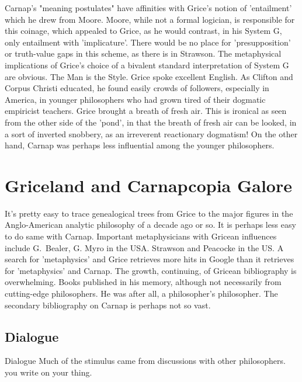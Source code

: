 \documentclass[10pt,titlepage]{book}
\begin{document}
{Carnap's "meaning postulates" have affinities with Grice's notion  of 'entailment' which he drew from Moore.
Moore, while not a formal logician, is responsible for this coinage, which appealed to Grice, as he would contrast, in his System G, only entailment with 'implicature'. 
There would be no place for 'presupposition' or truth-value gaps in this scheme, as there is in Strawson.
The metaphysical implications of Grice's choice of a bivalent standard interpretation of System G are obvious. 
The  Man is the Style.
Grice spoke excellent English.
As Clifton and Corpus Christi educated, he found easily crowds of followers, especially in America, in younger philosophers who had grown tired of their dogmatic empiricist teachers.
Grice brought a breath of fresh air.
This is ironical as seen from the other side of  the 'pond', in that the breath of fresh air can be looked, in a sort of inverted snobbery, as an irreverent reactionary dogmatism!
On the other hand, Carnap was perhaps less influential among the younger philosophers.   

\section{Griceland and Carnapcopia Galore}

It's pretty easy to trace genealogical trees from Grice to the major figures in the Anglo-American analytic philosophy of a decade ago or so.
It is perhaps less easy to do same with Carnap.
Important metaphysicians with Gricean influences include G.~Bealer, G. Myro 
in the USA. Strawson and  Peacocke in the US. A search for 'metaphysics' 
and Grice retrieves more hits in  Google than it retrieves for 'metaphysics' 
and Carnap. The growth, continuing,  of Gricean bibliography is overwhelming. 
Books published in his memory, although  not necessarily from cutting-edge 
philosophers. He was after all, a  philosopher's philosopher. The secondary 
bibliography on Carnap is perhaps not  so vast. 
 
\subsection{Dialogue}

Dialogue
Much of the stimulus came from discussions with other  philosophers.
you write on your thing.
 
}
\end{document}
